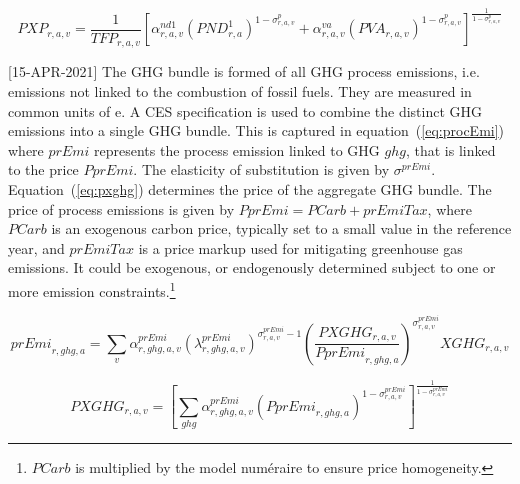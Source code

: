 \documentclass[11pt,letterpaper]{report}
\begin{document}
\begin{equation}
\label{eq:pxp}
\mathit{PXP}_{r,a,v} = \frac{1}{\mathit{TFP}_{\mathit{r,a,v}}}
   \left[
      \alpha^{\mathit{nd1}}_{\mathit{r,a,v}}
      \left( \mathit{PND}^1_{r,a}
      \right)^{1 - \sigma^{\mathit{p}}_{\mathit{r,a,v}}}
   +  \alpha^{\mathit{va}}_{\mathit{r,a,v}}
      \left( \mathit{PVA}_{r,a,v}
      \right)^{1 - \sigma^{\mathit{p}}_{\mathit{r,a,v}}}
   \right]^{\frac {1} {1 - \sigma^{\mathit{p}}_{\mathit{r,a,v}}}}
\end{equation}

[15-APR-2021] The GHG bundle is formed of all GHG process emissions, i.e.
emissions not linked to the combustion of fossil fuels. They are measured
in common units of \COT{}e. A CES specification is used to combine
the distinct GHG emissions into a single GHG bundle. This
is captured in equation~(\ref{eq:procEmi}) where $\mathit{prEmi}$
represents the process emission linked to GHG $\mathit{ghg}$, that
is linked to the price $\mathit{PprEmi}$. The elasticity of
substitution is given by $\sigma^{\mathit{prEmi}}$.
Equation~(\ref{eq:pxghg}) determines the price of the aggregate
GHG bundle. The price of process emissions is given by
$\mathit{PprEmi} = \mathit{PCarb} + \mathit{prEmiTax}$,
where $\mathit{PCarb}$ is an exogenous carbon price, typically
set to a small value in the reference year, and $\mathit{prEmiTax}$
is a price markup used for mitigating greenhouse gas emissions.
It could be exogenous, or endogenously determined subject to
one or more emission constraints.\footnote{$\mathit{PCarb}$ is
multiplied by the model num\'eraire to ensure price homogeneity.}

\begin{equation}
\label{eq:procEmi}
\mathit{prEmi}_{r,\mathit{ghg},a} = \sum_v{
   \alpha^{\mathit{prEmi}}_{r,\mathit{ghg},a,v}
   \left(\lambda^{\mathit{prEmi}}_{r,\mathit{ghg},a,v}
   \right)^{\sigma^{\mathit{prEmi}}_{\mathit{r,a,v}}-1}
   \left( \frac{\mathit{PXGHG}_{r,a,v}} {\mathit{PprEmi}_{r,\mathit{ghg},a}}
   \right)^{\sigma^{\mathit{prEmi}}_{\mathit{r,a,v}}}
   \mathit{XGHG}_{r,a,v}
}
\end{equation}

\begin{equation}
\label{eq:pxghg}
\mathit{PXGHG}_{r,a,v} =
   \left[\sum_{\mathit{ghg}}{
      \alpha^{\mathit{prEmi}}_{r,\mathit{ghg},a,v}
      \left( \mathit{PprEmi}_{r,\mathit{ghg},a}
      \right)^{1 - \sigma^{\mathit{prEmi}}_{\mathit{r,a,v}}}}
   \right]^{\frac {1} {1 - \sigma^{\mathit{\mathit{prEmi}}}_{\mathit{r,a,v}}}}
\end{equation}
\end{document}
